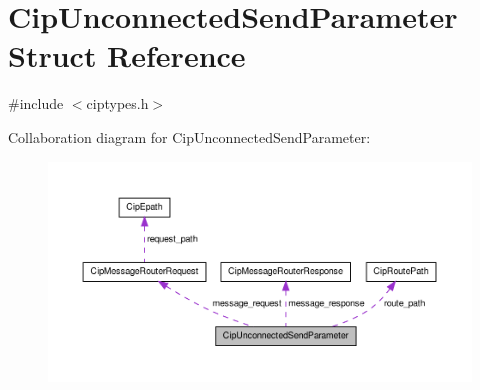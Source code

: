 \hypertarget{structCipUnconnectedSendParameter}{\section{\-Cip\-Unconnected\-Send\-Parameter \-Struct \-Reference}
\label{de/dcb/structCipUnconnectedSendParameter}
}


{\ttfamily \#include $<$ciptypes.\-h$>$}



\-Collaboration diagram for \-Cip\-Unconnected\-Send\-Parameter\-:
\nopagebreak
\begin{figure}[H]
\begin{center}
\leavevmode
\includegraphics[width=350pt]{dd/dd5/structCipUnconnectedSendParameter__coll__graph}
\end{center}
\end{figure}
